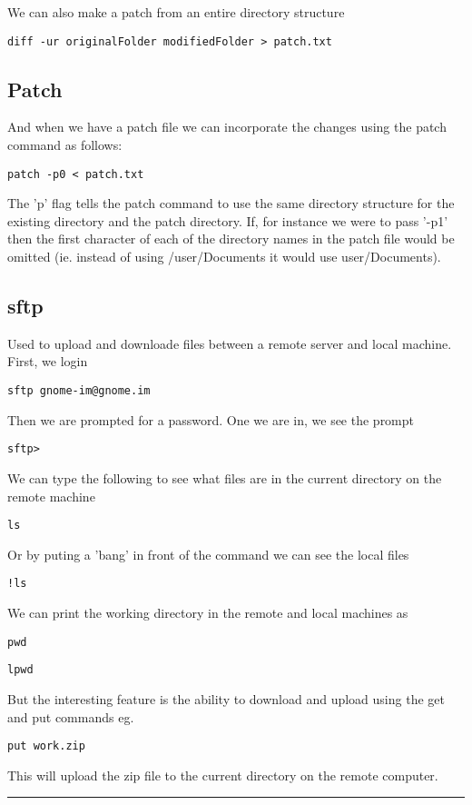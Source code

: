 \documentclass[a4paper, 10pt]{article}
\newcommand{\mybotrule}{\vspace{4mm}\hrule}
\begin{document}
We can also make a patch from an entire directory structure
\begin{verbatim}
diff -ur originalFolder modifiedFolder > patch.txt
\end{verbatim}

\subsection*{Patch}
\label{sec:patch}

And when we have a patch file we can incorporate the changes using the
patch command as follows:
\begin{verbatim}
patch -p0 < patch.txt
\end{verbatim}
The 'p' flag tells the patch command to use the same directory
structure for the existing directory and the patch directory. If, for
instance we were to pass '-p1' then the first character of each of the
directory names in the patch file would be omitted (ie. instead of
using /user/Documents it would use user/Documents).

\subsection*{sftp}
Used to upload and downloade files between a remote server and local machine. First, we login
\begin{verbatim}
sftp gnome-im@gnome.im
\end{verbatim}
Then we are prompted for a password. One we are in, we see the prompt
\begin{verbatim}
sftp>
\end{verbatim}
We can type the following to see what files are in the current directory on the remote machine
\begin{verbatim}
ls
\end{verbatim}
Or by puting a 'bang' in front of the command we can see the local files
\begin{verbatim}
!ls
\end{verbatim}
We can print the working directory in the remote and local machines as
\begin{verbatim}
pwd
\end{verbatim}
\begin{verbatim}
lpwd
\end{verbatim}
But the interesting feature is the ability to download and upload using the get and put commands
eg.
\begin{verbatim}
put work.zip 
\end{verbatim}
This will upload the zip file to the current directory on the remote computer. 
\mybotrule
\end{document}
